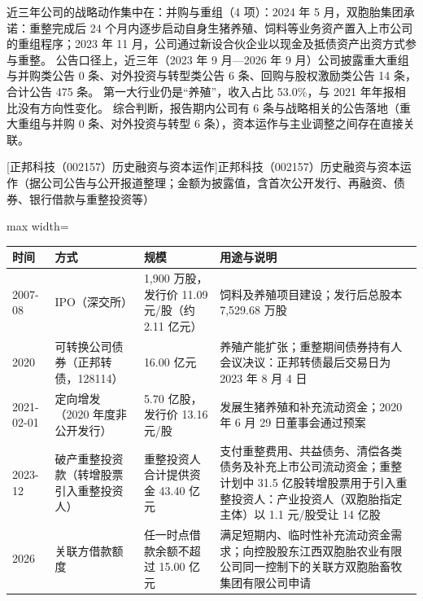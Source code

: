  近三年公司的战略动作集中在：并购与重组（4 项）：2024 年 5 月，双胞胎集团承诺：重整完成后 24 个月内逐步启动自身生猪养殖、饲料等业务资产置入上市公司的重组程序；2023 年 11 月，公司通过新设合伙企业以现金及抵债资产出资方式参与重整。 公告口径上，近三年（2023 年 9 月---2026 年 9 月）公司披露重大重组与并购类公告 0 条、对外投资与转型类公告 6 条、回购与股权激励类公告 14 条，合计公告 475 条。 第一大行业仍是“养殖”，收入占比 53.0\%，与 2021 年年报相比没有方向性变化。 综合判断，报告期内公司有 6 条与战略相关的公告落地（重大重组与并购 0 条、对外投资与转型 6 条），资本运作与主业调整之间存在直接关联。

\begin{center}\small\setlength{\tabcolsep}{4pt}
[正邦科技（002157）历史融资与资本运作]{正邦科技（002157）历史融资与资本运作（据公司公告与公开报道整理；金额为披露值，含首次公开发行、再融资、债券、银行借款与重整投资等）}
\begin{adjustbox}{max width=\textwidth}
\begin{tabular}{@{}p{1.45cm}p{2.55cm}p{4.05cm}p{4.95cm}@{}}
\toprule
时间 & 方式 & 规模 & 用途与说明 \\
\midrule
2007-08 & IPO（深交所） & 1,\allowbreak{}900 万股，\allowbreak{}发行价 11.09 元/\allowbreak{}股（约 2.11 亿元） & 饲料及养殖项目建设；发行后总股本 7,\allowbreak{}529.68 万股 \\
2020 & 可转换公司债券（正邦转债，128114） & 16.00 亿元 & 养殖产能扩张；重整期间债券持有人会议决议：正邦转债最后交易日为 2023 年 8 月 4 日 \\
2021-02-01 & 定向增发（2020 年度非公开发行） & 5.70 亿股，\allowbreak{}发行价 13.16 元/\allowbreak{}股 & 发展生猪养殖和补充流动资金；2020 年 6 月 29 日董事会通过预案 \\
2023-12 & 破产重整投资款（转增股票引入重整投资人） & 重整投资人合计提供资金 43.40 亿元 & 支付重整费用、\allowbreak{}共益债务、\allowbreak{}清偿各类债务及补充上市公司流动资金；重整计划中 31.5 亿股转增股票用于引入重整投资人：产业投资人（双胞胎指定主体）以 1.1 元/\allowbreak{}股受让 14 亿股 \\
2026 & 关联方借款额度 & 任一时点借款余额不超过 15.00 亿元 & 满足短期内、\allowbreak{}临时性补充流动资金需求；向控股股东江西双胞胎农业有限公司同一控制下的关联方双胞胎畜牧集团有限公司申请 \\
\bottomrule
\end{tabular}
\end{adjustbox}
\end{center}

